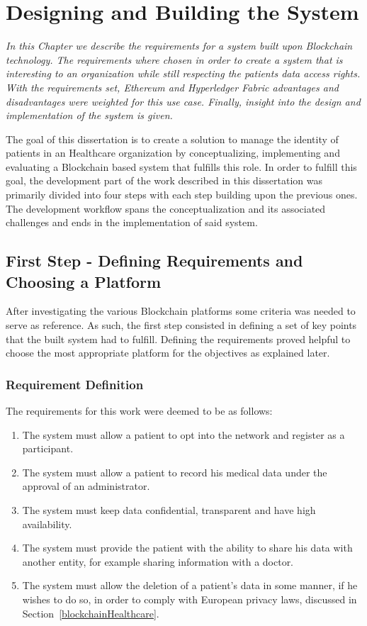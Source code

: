\chapter{Designing and Building the System} \label{development}

\emph{In this Chapter we describe the requirements for a system built upon
Blockchain technology. The requirements where chosen in order to create a
system that is interesting to an organization while still respecting the
patients data access rights. With the requirements set, Ethereum and
Hyperledger Fabric advantages and disadvantages were weighted for this use
case. Finally, insight into the design and implementation of the system is
given.}

The goal of this dissertation is to create a solution to manage the identity of
patients in an Healthcare organization by conceptualizing, implementing and
evaluating a Blockchain based system that fulfills this role. In order to
fulfill this goal, the development part of the work described in this
dissertation was primarily divided into four steps with each step building upon
the previous ones. The development workflow spans the conceptualization and its
associated challenges and ends in the implementation of said system.

\section{First Step - Defining Requirements and Choosing a Platform}
\label{choosingHyperledger}

After investigating the various Blockchain platforms some criteria was needed
to serve as reference. As such, the first step consisted in defining a set of
key points that the built system had to fulfill. Defining the requirements
proved helpful to choose the most appropriate platform for the objectives as
explained later.

\subsection{Requirement Definition} 
The requirements for this work were deemed to be as follows:

\renewcommand{\labelenumi}{\Roman{enumi}.}
\begin{enumerate}
  \item The system must allow a patient to opt into the network and register as
    a participant.
  \item The system must allow a patient to record his medical data under the
    approval of an administrator.
  \item The system must keep data confidential, transparent and have
    high availability.
  \item The system must provide the patient with the ability to share his data
    with another entity, for example sharing information with a doctor.
  \item The system must allow the deletion of a patient's data in some manner,
    if he wishes to do so, in order to comply with European privacy laws,
    discussed in Section~\ref{blockchainHealthcare}.
\end{enumerate}

